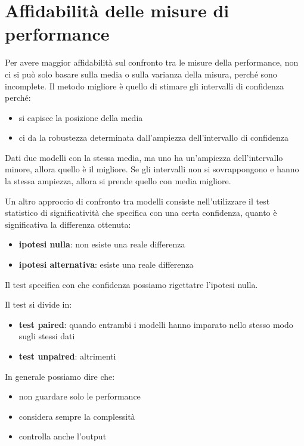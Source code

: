 \section{Affidabilità delle misure di performance}
Per avere maggior affidabilità sul confronto tra le misure della performance, non ci
si può solo basare sulla media o sulla varianza della misura, perché sono incomplete.
Il metodo migliore è quello di stimare gli intervalli di confidenza perché:
\begin{itemize}
    \item si capisce la posizione della media
    \item ci da la robustezza determinata dall'ampiezza dell'intervallo di confidenza
\end{itemize}
Dati due modelli con la stessa media, ma uno ha un'ampiezza dell'intervallo minore,
allora quello è il migliore. Se gli intervalli non si sovrappongono e hanno la 
stessa ampiezza, allora si prende quello con media migliore.

Un altro approccio di confronto tra modelli consiste nell'utilizzare il test statistico 
di significatività che specifica con una certa confidenza, quanto è significativa
la differenza ottenuta:
\begin{itemize}
    \item \textbf{ipotesi nulla}: non esiste una reale differenza
    \item \textbf{ipotesi alternativa}: esiste una reale differenza
\end{itemize} 
Il test specifica con che confidenza possiamo rigettatre l'ipotesi nulla.

Il test si divide in:
\begin{itemize}
    \item \textbf{test paired}: quando entrambi i modelli hanno imparato nello 
    stesso modo sugli stessi dati
    \item \textbf{test unpaired}: altrimenti
\end{itemize}

In generale possiamo dire che:
\begin{itemize}
    \item non guardare solo le performance
    \item considera sempre la complessità
    \item controlla anche l'output
\end{itemize}